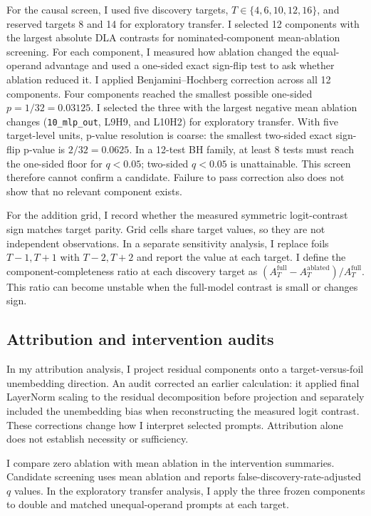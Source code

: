 \documentclass[11pt]{article}
\begin{document}
For the causal screen, I used five discovery targets, $T\in\{4,6,10,12,16\}$, and reserved targets 8 and 14 for exploratory transfer. I selected 12 components with the largest absolute DLA contrasts for nominated-component mean-ablation screening. For each component, I measured how ablation changed the equal-operand advantage and used a one-sided exact sign-flip test to ask whether ablation reduced it. I applied Benjamini--Hochberg correction across all 12 components. Four components reached the smallest possible one-sided $p=1/32=0.03125$. I selected the three with the largest negative mean ablation changes (\texttt{10\_mlp\_out}, L9H9, and L10H2) for exploratory transfer. With five target-level units, p-value resolution is coarse: the smallest two-sided exact sign-flip p-value is $2/32=0.0625$. In a 12-test BH family, at least 8 tests must reach the one-sided floor for $q<0.05$; two-sided $q<0.05$ is unattainable. This screen therefore cannot confirm a candidate. Failure to pass correction also does not show that no relevant component exists.

For the addition grid, I record whether the measured symmetric logit-contrast sign matches target parity. Grid cells share target values, so they are not independent observations. In a separate sensitivity analysis, I replace foils $T-1,T+1$ with $T-2,T+2$ and report the value at each target. I define the component-completeness ratio at each discovery target as $(A_T^{\mathrm{full}}-A_T^{\mathrm{ablated}})/A_T^{\mathrm{full}}$. This ratio can become unstable when the full-model contrast is small or changes sign.

\subsection{Attribution and intervention audits}

In my attribution analysis, I project residual components onto a target-versus-foil unembedding direction. An audit corrected an earlier calculation: it applied final LayerNorm scaling to the residual decomposition before projection and separately included the unembedding bias when reconstructing the measured logit contrast. These corrections change how I interpret selected prompts. Attribution alone does not establish necessity or sufficiency.

I compare zero ablation with mean ablation in the intervention summaries. Candidate screening uses mean ablation and reports false-discovery-rate-adjusted $q$ values. In the exploratory transfer analysis, I apply the three frozen components to double and matched unequal-operand prompts at each target.
\end{document}
